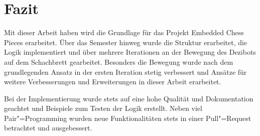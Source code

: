 
\section{Fazit}
\label{sec:conclusion}

Mit dieser Arbeit haben wird die Grundlage für das Projekt Embedded Chess Pieces erarbeitet. Über das Semester hinweg wurde die Struktur erarbeitet, die Logik implementiert und über mehrere Iterationen an der Bewegung des Dezibots auf dem Schachbrett gearbeitet. Besonders die Bewegung wurde nach dem grundlegenden Ansatz in der ersten Iteration stetig verbessert und Ansätze für weitere Verbesserungen und Erweiterungen in dieser Arbeit erarbeitet.

Bei der Implementierung wurde stets auf eine hohe Qualität und Dokumentation geachtet und Beispiele zum Testen der Logik erstellt. Neben viel Pair"=Programming wurden neue Funktionalitäten stets in einer Pull"=Request betrachtet und ausgebessert. 

